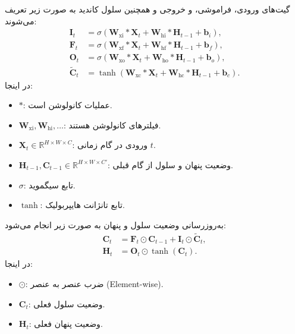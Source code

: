 گیت‌های ورودی، فراموشی، و خروجی و همچنین سلول کاندید به صورت زیر تعریف می‌شوند:
\[
\begin{aligned}
	\mathbf{I}_t &= \sigma \left( \mathbf{W}_{\text{xi}} * \mathbf{X}_t + \mathbf{W}_{\text{hi}} * \mathbf{H}_{t-1} + \mathbf{b}_i \right), \\
	\mathbf{F}_t &= \sigma \left( \mathbf{W}_{\text{xf}} * \mathbf{X}_t + \mathbf{W}_{\text{hf}} * \mathbf{H}_{t-1} + \mathbf{b}_f \right), \\
	\mathbf{O}_t &= \sigma \left( \mathbf{W}_{\text{xo}} * \mathbf{X}_t + \mathbf{W}_{\text{ho}} * \mathbf{H}_{t-1} + \mathbf{b}_o \right), \\
	\tilde{\mathbf{C}}_t &= \tanh \left( \mathbf{W}_{\text{xc}} * \mathbf{X}_t + \mathbf{W}_{\text{hc}} * \mathbf{H}_{t-1} + \mathbf{b}_c \right).
\end{aligned}
\]
در اینجا:
\begin{itemize}
	\item \(*\): عملیات کانولوشن است.
	\item \(\mathbf{W}_{\text{xi}}, \mathbf{W}_{\text{hi}}, \dots\): فیلترهای کانولوشن هستند.
	\item \(\mathbf{X}_t \in \mathbb{R}^{H \times W \times C}\): ورودی در گام زمانی \(t\).
	\item \(\mathbf{H}_{t-1}, \mathbf{C}_{t-1} \in \mathbb{R}^{H \times W \times C'}\): وضعیت پنهان و سلول از گام قبلی.
	\item \(\sigma\): تابع سیگموید.
	\item \(\tanh\): تابع تانژانت هایپربولیک.
\end{itemize}

به‌روزرسانی وضعیت سلول و پنهان به صورت زیر انجام می‌شود:
\[
\begin{aligned}
	\mathbf{C}_t &= \mathbf{F}_t \odot \mathbf{C}_{t-1} + \mathbf{I}_t \odot \tilde{\mathbf{C}}_t, \\
	\mathbf{H}_t &= \mathbf{O}_t \odot \tanh(\mathbf{C}_t).
\end{aligned}
\]
در اینجا:
\begin{itemize}
	\item \(\odot\): ضرب عنصر به عنصر (Element-wise).
	\item \(\mathbf{C}_t\): وضعیت سلول فعلی.
	\item \(\mathbf{H}_t\): وضعیت پنهان فعلی.
\end{itemize}

